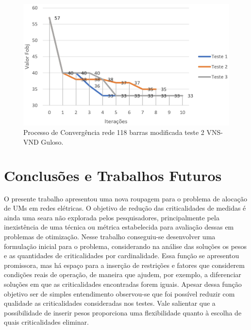 \documentclass[12pt]{article}
\begin{document}
\begin{figure}[H]
	\centering 
	\includegraphics[scale=0.70]{figuras/VND_118_2_Guloso.jpg}
	\caption{Processo de Convergência rede 118 barras modificada teste 2 VNS-VND Guloso.}
	\label{fig20} %
\end{figure}


\section{Conclusões e Trabalhos Futuros}

O presente trabalho apresentou uma nova roupagem para o problema de alocação de UMs em redes elétricas. O objetivo de redução das criticalidades de medidas é ainda uma seara não explorada pelos pesquisadores, principalmente pela inexistência de uma técnica ou métrica estabelecida para avaliação dessas em problemas de otimização. Nesse trabalho conseguiu-se desenvolver uma formulação inicial para o problema, considerando na análise das soluções os pesos e as quantidades de criticalidades por cardinalidade. Essa função se apresentou promissora, mas há espaço para a inserção de restrições e fatores que considerem condições reais de operação, de maneira que ajudem, por exemplo, a diferenciar soluções em que as criticalidades encontradas forem iguais. Apesar dessa função objetivo ser de simples entendimento observou-se que foi possível reduzir com qualidade as criticalidades consideradas nos testes. Vale salientar que a possibilidade de inserir pesos proporciona uma flexibilidade quanto à escolha de quais criticalidades eliminar.
\end{document}
